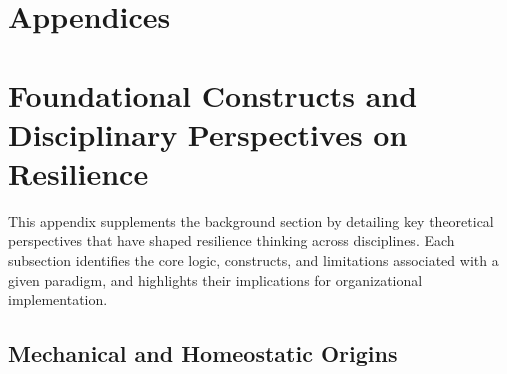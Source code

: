\newpage
\appendix

\renewcommand{\thefigure}{A.\arabic{figure}}
\setcounter{figure}{0} %

\section*{Appendices}

\section{Foundational Constructs and Disciplinary Perspectives on Resilience}
\label{appendix:A}

This appendix supplements the background section by detailing key theoretical perspectives that have shaped resilience thinking across disciplines. Each subsection identifies the core logic, constructs, and limitations associated with a given paradigm, and highlights their implications for organizational implementation.

\subsection{Mechanical and Homeostatic Origins}
\label{appendix:A1}

